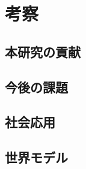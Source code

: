 \chapter{考察}
\label{chap:discussion}

\section{本研究の貢献}

\section{今後の課題}

\section{社会応用}

\section{世界モデル}